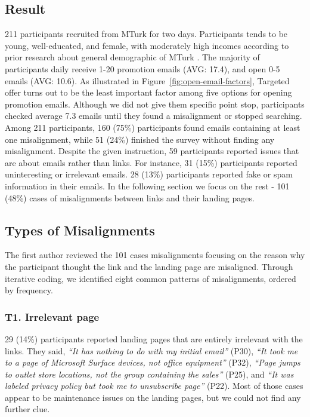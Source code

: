 \documentclass{sigchi}
\begin{document}
\subsection{Result}
211 participants recruited from MTurk for two days. Participants tends to be young, well-educated, and female, with moderately high incomes according to prior research about general demographic of MTurk \cite{mason_conducting_2012}. The majority of participants daily receive 1-20 promotion emails (AVG: 17.4), and open 0-5 emails (AVG: 10.6). As illustrated in Figure~\ref{fig:open-email-factors}, Targeted offer turns out to be the least important factor among five options for opening promotion emails. Although we did not give them specific point stop, participants checked average 7.3 emails until they found a misalignment or stopped searching. Among 211 participants, 160 (75\%) participants found emails containing at least one misalignment, while 51 (24\%) finished the survey without finding any misalignment. Despite the given instruction, 59 participants reported issues that are about emails rather than links. For instance, 31 (15\%) participants reported uninteresting or irrelevant emails. 28 (13\%) participants reported fake or spam information in their emails. In the following section we focus on the rest - 101 (48\%) cases of misalignments between links and their landing pages. 


\subsection{Types of Misalignments}
The first author reviewed the 101 cases misalignments focusing on the reason why the participant thought the link and the landing page are misaligned. Through iterative coding, we identified eight common patterns of misalignments, ordered by frequency. 
\subsubsection{T1. Irrelevant page}
29 (14\%) participants reported landing pages that are entirely irrelevant with the links. They said, \textit{``It has nothing to do with my initial email''} (P30), \textit{``It took me to a page of Microsoft Surface devices, not office equipment''} (P32), \textit{``Page jumps to outlet store locations, not the group containing the sales''} (P25), and \textit{``It was labeled privacy policy but took me to unsubscribe page''} (P22). Most of those cases appear to be maintenance issues on the landing pages, but we could not find any further clue. 
\end{document}
